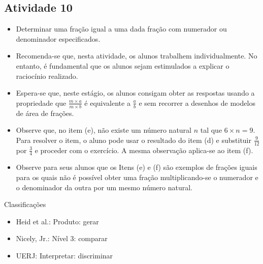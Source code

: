 \begin{multicols}{2}
\subsection{Atividade 10}

\begin{itemize} %
    \item       Determinar uma fração igual a uma dada fração com numerador ou 
denominador especificados.
\end{itemize} %
  
\begin{itemize} %
    \item       Recomenda-se que, nesta atividade, os alunos trabalhem 
individualmente. No entanto, é fundamental que os alunos sejam estimulados a 
explicar o raciocínio realizado.
    \item       Espera-se que, neste estágio, os alunos consigam obter as 
respostas usando a propriedade que       $\frac{m \times a}{m \times b}$       é 
equivalente a       $\frac{a}{b}$       e sem recorrer a desenhos de modelos de 
área de frações.
    \item       Observe que, no item (e), não existe um número natural       $n$ 
      tal que       $6 \times n = 9$. Para resolver o item, o aluno pode usar o 
resultado do item (d) e substituir       $\frac{9}{12}$       por       
$\frac{3}{4}$       e proceder com o exercício. A mesma observação aplica-se ao 
item (f).
    \item       Observe para seus alunos que os Itens (e) e (f) são exemplos de 
frações iguais para os quais não é possível obter uma fração multiplicando-se o 
numerador e o denominador da outra por um mesmo número natural.
\end{itemize} %
  
  
  Classificações  
\begin{itemize} %
    \item       Heid et al.: Produto: gerar
    \item       Nicely, Jr.: Nível 3: comparar
    \item       UERJ: Interpretar: discriminar
\end{itemize} %
  


\end{multicols}
